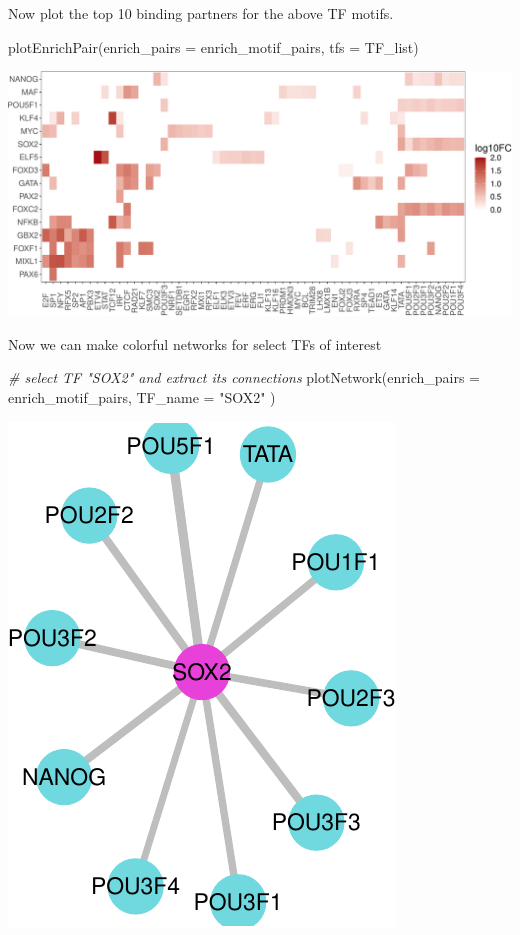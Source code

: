 \documentclass[
]{article}
\newenvironment{Shaded}{}{}
\newcommand{\AttributeTok}[1]{\textcolor[rgb]{0.49,0.56,0.16}{#1}}
\newcommand{\CommentTok}[1]{\textcolor[rgb]{0.38,0.63,0.69}{\textit{#1}}}
\newcommand{\FunctionTok}[1]{\textcolor[rgb]{0.02,0.16,0.49}{#1}}
\newcommand{\NormalTok}[1]{#1}
\newcommand{\StringTok}[1]{\textcolor[rgb]{0.25,0.44,0.63}{#1}}
\begin{document}
Now plot the top 10 binding partners for the above TF motifs.

\begin{Shaded}
\begin{Highlighting}[]

\FunctionTok{plotEnrichPair}\NormalTok{(}\AttributeTok{enrich\_pairs =}\NormalTok{ enrich\_motif\_pairs,}
               \AttributeTok{tfs =}\NormalTok{ TF\_list)}
\end{Highlighting}
\end{Shaded}

\includegraphics{enrichmotifpairR_user_manual_guide_files/figure-latex/H1_ESC_5-1.pdf}

Now we can make colorful networks for select TFs of interest

\begin{Shaded}
\begin{Highlighting}[]

\CommentTok{\# select TF "SOX2" and extract its connections}
\FunctionTok{plotNetwork}\NormalTok{(}\AttributeTok{enrich\_pairs =}\NormalTok{ enrich\_motif\_pairs, }
            \AttributeTok{TF\_name =} \StringTok{"SOX2"}
\NormalTok{            )}
\end{Highlighting}
\end{Shaded}

\includegraphics{enrichmotifpairR_user_manual_guide_files/figure-latex/H1_ESC_6-1.pdf}
\end{document}
